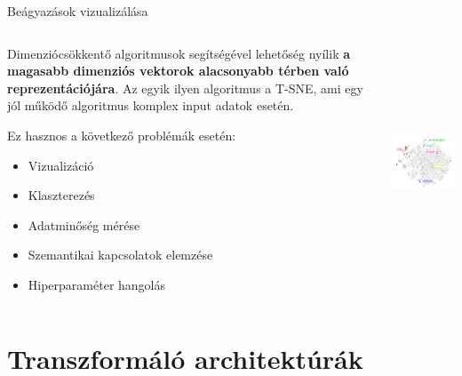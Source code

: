 \documentclass[english, aspectratio=169]{beamer}
\makeatletter
\let\origtableofcontents=\tableofcontents
\def\tableofcontents{\@ifnextchar[{\origtableofcontents}{\gobbletableofcontents}}
\def\gobbletableofcontents#1{\origtableofcontents}
\makeatother
\begin{document}
\begin{frame}{Beágyazások vizualizálása}
\begin{columns}
\begin{column}{.5\textwidth}
Dimenziócsökkentő algoritmusok segítségével lehetőség nyílik \textbf{a magasabb dimenziós vektorok alacsonyabb térben való reprezentációjára}. Az egyik ilyen algoritmus a T-SNE, ami egy jól működő algoritmus komplex input adatok esetén.\par\smallskip
Ez hasznos a következő problémák esetén:
\begin{itemize}
	\item Vizualizáció
	\item Klaszterezés
	\item Adatminőség mérése
	\item Szemantikai kapcsolatok elemzése
	\item Hiperparaméter hangolás
\end{itemize}
\end{column}
\begin{column}{.5\textwidth}
\begin{center}
\includegraphics[width=7cm, height=7cm, keepaspectratio]{images/transformer_1.png}
\end{center}
\end{column}
\end{columns}
\end{frame}

\section{Transzformáló architektúrák}

\begin{frame}{}
\tableofcontents[currentsection]
\end{frame}
\end{document}
